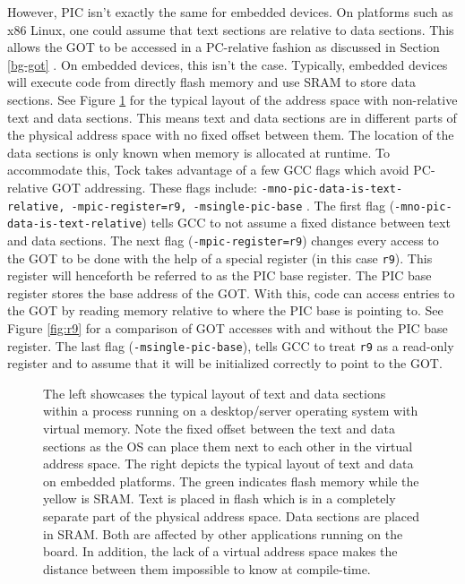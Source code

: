 \documentclass[12pt]{ucsddissertation}
\begin{document}
However, PIC isn't exactly the same for embedded devices. On platforms such as x86 Linux, one could assume that text sections are relative to data sections. This allows the GOT to be accessed in a PC-relative fashion as discussed in Section \ref{bg-got} . On embedded devices, this isn't the case. Typically, embedded devices will execute code from directly flash memory and use SRAM to store data sections. See Figure \ref{fig:non-relative} for the typical layout of the address space with non-relative text and data sections. This means text and data sections are in different parts of the physical address space with no fixed offset between them. The location of the data sections is only known when memory is allocated at runtime. To accommodate this, Tock takes advantage of a few GCC flags which avoid PC-relative GOT addressing. These flags include: \texttt{-mno-pic-data-is-text-relative, -mpic-register=r9, -msingle-pic-base} \cite{tock-compilation, arch-gcc}. The first flag (\texttt{-mno-pic-data-is-text-relative}) tells GCC to not assume a fixed distance between text and data sections. The next flag (\texttt{-mpic-register=r9}) changes every access to the GOT to be done with the help of a special register (in this case \texttt{r9}). This register will henceforth be referred to as the PIC base register. The PIC base register stores the base address of the GOT. With this, code can access entries to the GOT by reading memory relative to where the PIC base is pointing to. See Figure \ref{fig:r9} for a comparison of GOT accesses with and without the PIC base register. The last flag (\texttt{-msingle-pic-base}), tells GCC to treat \texttt{r9} as a read-only register and to assume that it will be initialized correctly to point to the GOT.

\begin{figure}
 \begin{minipage}{0.45\textwidth}
     
 \end{minipage}
 \begin{minipage}{0.45\textwidth}
    
 \end{minipage}
    \caption[Non-relative Text and Data Sections]{The left showcases the typical layout of text and data sections within a process running on a desktop/server operating system with virtual memory. Note the fixed offset between the text and data sections as the OS can place them next to each other in the virtual address space. The right depicts the typical layout of text and data on embedded platforms. The green indicates flash memory while the yellow is SRAM. Text is placed in flash which is in a completely separate part of the physical address space. Data sections are placed in SRAM. Both are affected by other applications running on the board. In addition, the lack of a virtual address space makes the distance between them impossible to know at compile-time.}
    \label{fig:non-relative}
\end{figure}
\end{document}
